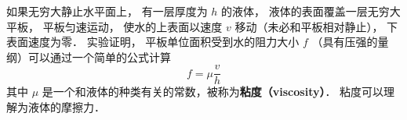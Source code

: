 
\begin{issues}
\issueDraft
\end{issues}

如果无穷大静止水平面上， 有一层厚度为 $h$ 的液体， 液体的表面覆盖一层无穷大平板， 平板匀速运动， 使水的上表面以速度 $v$ 移动（未必和平板相对静止）， 下表面速度为零． 实验证明， 平板单位面积受到水的阻力大小 $f$ （具有压强的量纲）可以通过一个简单的公式计算
\begin{equation}
f = \mu \frac{v}{h}
\end{equation}
其中 $\mu$ 是一个和液体的种类有关的常数，被称为\textbf{粘度（viscosity）}． 粘度可以理解为液体的摩擦力．
